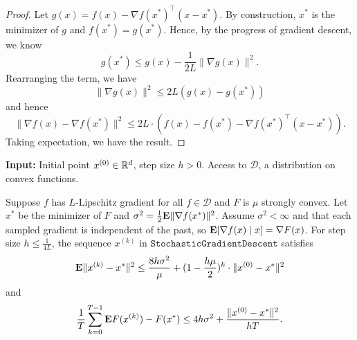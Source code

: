 \begin{proof}
Let $g(x)=f(x)-\nabla f(x^{*})^{\top}(x-x^{*})$. By construction,
$x^{*}$ is the minimizer of $g$ and $f(x^{*})=g(x^{*})$. Hence,
by the progress of gradient descent, we know
\[
g(x^{*})\leq g(x)-\frac{1}{2L}\|\nabla g(x)\|^{2}.
\]
Rearranging the term, we have
\[
\|\nabla g(x)\|^{2}\leq2L(g(x)-g(x^{*}))
\]
and hence
\[
\|\nabla f(x)-\nabla f(x^{*})\|^{2}\leq2L\cdot(f(x)-f(x^{*})-\nabla f(x^{*})^{\top}(x-x^{*})).
\]
Taking expectation, we have the result.
\end{proof}
\begin{algorithm2e}[H]

\caption{$\mathtt{StochasticGradientDescent}$ (SGD)}

\SetAlgoLined

\textbf{Input:} Initial point $x^{(0)}\in\mathbb{R}^{d}$, step size $h>0$.
Access to $\mathcal{D}$, a distribution on convex functions.


\end{algorithm2e}
\begin{thm}
\label{thm:sgd_convex_strongly}Suppose $f$ has $L$-Lipschitz gradient
for all $f\in\mathcal{D}$ and $F$ is $\mu$ strongly convex. Let
$x^{*}$ be the minimizer of $F$ and $\sigma^{2}=\frac{1}{2}\mathbf{E}\|\nabla f(x^{*})\|^{2}$.
Assume $\sigma^{2}<\infty$ and that each sampled gradient is independent
of the past, so $\mathbf{E}[\nabla f(x)\mid x]=\nabla F(x)$. For step size
$h\leq\frac{1}{4L}$, the sequence $x^{(k)}$ in $\mathtt{StochasticGradientDescent}$
satisfies
\[
\mathbf{E}\|x^{(k)}-x^{*}\|^{2}\leq\frac{8h\sigma^{2}}{\mu}+(1-\frac{h\mu}{2})^{k}\cdot\|x^{(0)}-x^{*}\|^{2}
\]
and
\[
\frac{1}{T}\sum^{T-1}_{k=0}\mathbf{E} F(x^{(k)})-F(x^{*})\leq4h\sigma^{2}+\frac{\|x^{(0)}-x^{*}\|^{2}}{hT}.
\]
\end{thm}

